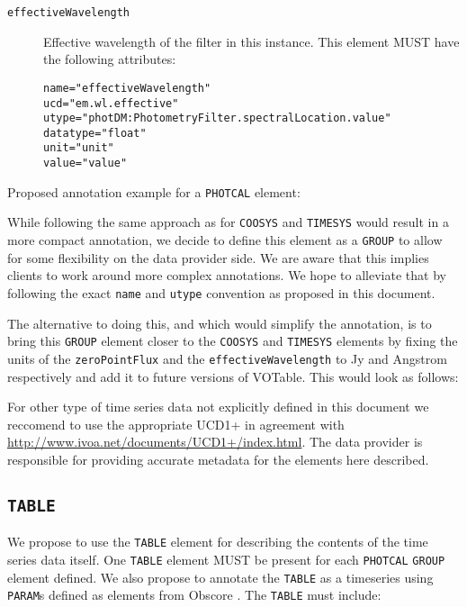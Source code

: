 \documentclass[11pt,a4paper]{ivoa}
\let\fg=\color
\def\attr#1{{\tt{\fg{DarkRed}#1}}}
\def\elem#1{{\tt{\fg{DarkRed}#1}}}
\def\attrval#1#2{{\tt{\fg{DarkRed}#1}="{\fg{DarkPurple}#2}"}}
\begin{document}
\begin{description}
\item[\elem{effectiveWavelength}] Effective wavelength of the filter in this instance. This element MUST have the following attributes:
\begin{description}
    \item[\attrval{name}{effectiveWavelength}]
    \item[\attrval{ucd}{em.wl.effective}]
    \item[\attrval{utype}{photDM:PhotometryFilter.spectralLocation.value}] 
    \item[\attrval{datatype}{float}]
    \item[\attrval{unit}{unit}]
    \item[\attrval{value}{value}]
\end{description}
\end{description}

Proposed annotation example for a \elem{PHOTCAL} element: 



While following the same approach as for \elem{COOSYS} and \elem{TIMESYS} would result in a more compact annotation, we decide to define this element as a \elem{GROUP} to allow for some flexibility on the data provider side. We are aware that this implies clients to work around more complex annotations. We hope to alleviate that by following the exact \attr{name} and \attr{utype} convention as proposed in this document.

The alternative to doing this, and which would simplify the annotation, is to bring this \elem{GROUP} element closer to the \elem{COOSYS} and \elem{TIMESYS} elements by fixing the units of the \attr{zeroPointFlux} and the \attr{effectiveWavelength} to Jy and Angstrom respectively and add it to future versions of VOTable. This would look as follows: 




%

For other type of time series data not explicitly defined in this document we reccomend to use the appropriate UCD1+ in agreement with \url{http://www.ivoa.net/documents/UCD1+/index.html}. The data provider is responsible for providing accurate metadata for the elements here described.


%
\subsection{\elem{TABLE}}
We propose to use the \elem{TABLE} element for describing the contents of the time series data itself. One \elem{TABLE} element MUST be present for each \elem{PHOTCAL} \elem{GROUP} element defined. We also propose to annotate the \elem{TABLE} as a timeseries using \elem{PARAM}s defined as elements from Obscore \citep{std:OBSCORE1.1}.   
The \elem{TABLE} must include:
\end{document}
